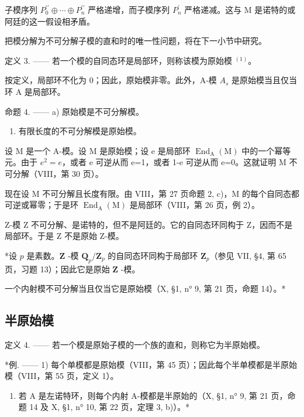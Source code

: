 子模序列 \(P_{0}^{\prime\prime} \oplus \cdots \oplus P_{n}^{\prime\prime}\) 严格递增，而子模序列 \(P_{n}^{\prime}\) 严格递减。这与 M 是诺特的或阿廷的这一假设相矛盾。

把模分解为不可分解子模的直和时的唯一性问题，将在下一小节中研究。

定义 3. —— 若一个模的自同态环是局部环，则称该模为原始模 \(^{(1)}\)。

按定义，局部环不化为 0；因此，原始模非零。此外，A-模 \(A_{s}\) 是原始模当且仅当环 A 是局部环。

命题 4. —— a) 原始模是不可分解模。

\begin{enumerate}
\def\labelenumi{\alph{enumi})}
\setcounter{enumi}{1}
\tightlist
\item
  有限长度的不可分解模是原始模。
\end{enumerate}

设 M 是一个 A-模。设 M 是原始模；设 e 是局部环 \(\operatorname{End}_{\mathrm{A}}(\mathrm{M})\) 中的一个幂等元。由于 \(e^{2}=e\)，或者 e 可逆从而 e=1，或者 1-e 可逆从而 e=0。这就证明 M 不可分解（VIII，第 30 页）。

现在设 M 不可分解且长度有限。由 VIII，第 27 页命题 2, c)，M 的每个自同态都可逆或幂零；于是环 \(\operatorname{End}_{\mathrm{A}}(\mathrm{M})\) 是局部环（VIII，第 26 页，例 2）。

Z-模 Z 不可分解、是诺特的，但不是阿廷的。它的自同态环同构于 Z，因而不是局部环。于是 Z 不是原始 Z-模。

*设 \(p\) 是素数。\(\mathbf{Z}\) -模 \(\mathbf{Q}_p / \mathbf{Z}_p\) 的自同态环同构于局部环 \(\mathbf{Z}_p\)（参见 VII, §4, 第 65 页，习题 13）；因此它是原始 \(\mathbf{Z}\) -模。

一个内射模不可分解当且仅当它是原始模（X, §1, n° 9, 第 21 页，命题 14）。*

\subsection{半原始模}

定义 4. —— 若一个模是原始子模的一个族的直和，则称它为半原始模。

*例. —— 1) 每个单模都是原始模（VIII，第 45 页）；因此每个半单模都是半原始模（VIII，第 55 页，定义 1）。

\begin{enumerate}
\def\labelenumi{\arabic{enumi})}
\setcounter{enumi}{1}
\tightlist
\item
  若 A 是左诺特环，则每个内射 A-模都是半原始的（X, §1, n° 9, 第 21 页，命题 14 及 X, §1, n° 10, 第 22 页，定理 3, b)）。*
\end{enumerate}

